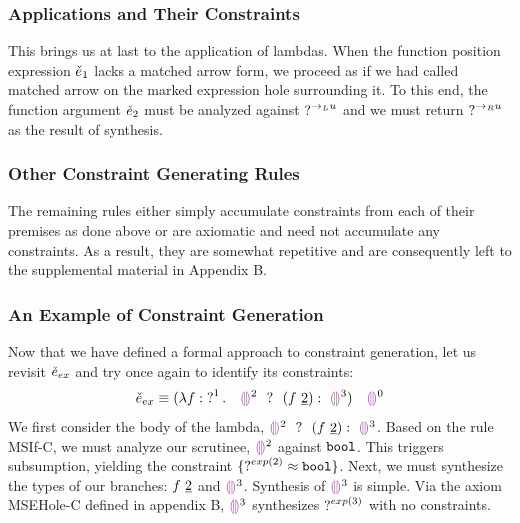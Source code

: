\subsubsection{Applications and Their Constraints}
This brings us at last to the application of lambdas. When the function position expression $\ECMV_1$ lacks a matched arrow form, we proceed as if we had called matched arrow on the marked expression hole surrounding it. To this end, the function argument $\ECMV_2$ must be analyzed against $\TUnknown^{\rightarrow_L{u}}$ and we must return $\TUnknown^{\rightarrow_R{u}}$ as the result of synthesis. 
\begin{mathpar}
\end{mathpar}

\subsubsection{Other Constraint Generating Rules}
The remaining rules either simply accumulate constraints from each of their premises as done above or are axiomatic and need not accumulate any constraints. As a result, they are somewhat repetitive and are consequently left to the supplemental material in Appendix B. 

\subsubsection{An Example of Constraint Generation}
Now that we have defined a formal approach to constraint generation, let us revisit $\ECMV_{ex}$ and try once again to identify its constraints:
$$\ECMV_{ex} \equiv \ECAp{(\ECLam{f}{\TUnknown^1}{~~\ECIf{\EEHole^2~}{~(\ECAp{f}{\underline{2}})}{~\EEHole^3}})}{~~\EEHole^0}$$
We first consider the body of the lambda, $\ECIf{\EEHole^2~}{~(\ECAp{f}{\underline{2}})}{~\EEHole^3}$. Based on the rule MSIf-C, we must analyze our scrutinee, $\EEHole^2$ against $\tbool$. This triggers subsumption, yielding the constraint $\{ \TUnknown^{exp(2)} \approx \tbool \}$. Next, we must synthesize the types of our branches: $\ECAp{f}{\underline{2}}$ and $\EEHole^3$. Synthesis of $\EEHole^3$ is simple. Via the axiom MSEHole-C defined in appendix B, $\EEHole^3$ synthesizes $\TUnknown^{exp(3)}$ with no constraints.

